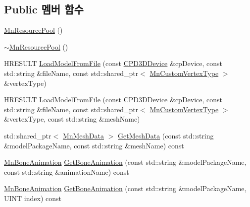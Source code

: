 \subsection*{Public 멤버 함수}
\begin{DoxyCompactItemize}
\item 
\hyperlink{class_m_n_l_1_1_mn_resource_pool_a3e3bfb192960b20c20d598b87190093a}{Mn\+Resource\+Pool} ()
\item 
\hyperlink{class_m_n_l_1_1_mn_resource_pool_a22ebe684736fca1eca2632728c957816}{$\sim$\+Mn\+Resource\+Pool} ()
\item 
H\+R\+E\+S\+U\+LT \hyperlink{class_m_n_l_1_1_mn_resource_pool_ac41948326baafb260a2c198ee1baf387}{Load\+Model\+From\+File} (const \hyperlink{namespace_m_n_l_a1eec210db8f309a4a9ac0d9658784c31}{C\+P\+D3\+D\+Device} \&cp\+Device, const std\+::string \&file\+Name, const std\+::shared\+\_\+ptr$<$ \hyperlink{class_m_n_l_1_1_mn_custom_vertex_type}{Mn\+Custom\+Vertex\+Type} $>$ \&vertex\+Type)
\item 
H\+R\+E\+S\+U\+LT \hyperlink{class_m_n_l_1_1_mn_resource_pool_a3ed53e3938460f16c420f9968a6022a0}{Load\+Model\+From\+File} (const \hyperlink{namespace_m_n_l_a1eec210db8f309a4a9ac0d9658784c31}{C\+P\+D3\+D\+Device} \&cp\+Device, const std\+::string \&file\+Name, const std\+::shared\+\_\+ptr$<$ \hyperlink{class_m_n_l_1_1_mn_custom_vertex_type}{Mn\+Custom\+Vertex\+Type} $>$ \&vertex\+Type, const std\+::string \&mesh\+Name)
\item 
std\+::shared\+\_\+ptr$<$ \hyperlink{class_m_n_l_1_1_mn_mesh_data}{Mn\+Mesh\+Data} $>$ \hyperlink{class_m_n_l_1_1_mn_resource_pool_aec880e1f2103fe954fd08312256af4dd}{Get\+Mesh\+Data} (const std\+::string \&model\+Package\+Name, const std\+::string \&mesh\+Name) const
\item 
\hyperlink{class_m_n_l_1_1_mn_bone_animation}{Mn\+Bone\+Animation} \hyperlink{class_m_n_l_1_1_mn_resource_pool_a2def364302f9dc1a8c45f6d55885eef6}{Get\+Bone\+Animation} (const std\+::string \&model\+Package\+Name, const std\+::string \&animation\+Name) const
\item 
\hyperlink{class_m_n_l_1_1_mn_bone_animation}{Mn\+Bone\+Animation} \hyperlink{class_m_n_l_1_1_mn_resource_pool_a6fd196dd10a03c7cefa28500a5244999}{Get\+Bone\+Animation} (const std\+::string \&model\+Package\+Name, U\+I\+NT index) const
\end{DoxyCompactItemize}
